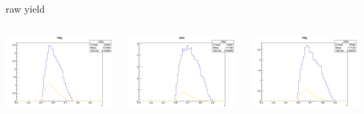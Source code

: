 \begin{frame}{raw yield}
\begin{columns}
\begin{column}[T]{0.25\textwidth}
\includegraphics[width = \textwidth]{results/yield/statistics/yield_x_Q2_z_0.50_5.500_0.60_neg.png}
\end{column}
\begin{column}[T]{0.25\textwidth}
\includegraphics[width = \textwidth]{results/yield/statistics/yield_x_Q2_z_0.50_5.500_0.70_pos.png}
\end{column}
\begin{column}[T]{0.25\textwidth}
\includegraphics[width = \textwidth]{results/yield/statistics/yield_x_Q2_z_0.50_5.500_0.70_neg.png}
\end{column}
\end{columns}
\end{frame}
